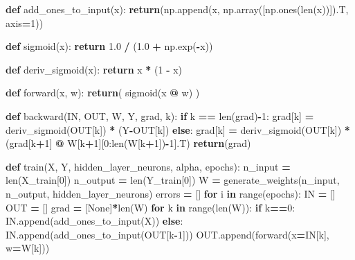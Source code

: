 \documentclass[
]{book}
\newenvironment{Shaded}{\begin{snugshade}}{\end{snugshade}}
\newcommand{\BuiltInTok}[1]{#1}
\newcommand{\ControlFlowTok}[1]{\textcolor[rgb]{0.13,0.29,0.53}{\textbf{#1}}}
\newcommand{\DecValTok}[1]{\textcolor[rgb]{0.00,0.00,0.81}{#1}}
\newcommand{\FloatTok}[1]{\textcolor[rgb]{0.00,0.00,0.81}{#1}}
\newcommand{\KeywordTok}[1]{\textcolor[rgb]{0.13,0.29,0.53}{\textbf{#1}}}
\newcommand{\NormalTok}[1]{#1}
\newcommand{\OperatorTok}[1]{\textcolor[rgb]{0.81,0.36,0.00}{\textbf{#1}}}
\newcommand{\VariableTok}[1]{\textcolor[rgb]{0.00,0.00,0.00}{#1}}
\begin{document}
\begin{Shaded}
\begin{Highlighting}[]
\KeywordTok{def}\NormalTok{ add\_ones\_to\_input(x):}
  \ControlFlowTok{return}\NormalTok{(np.append(x, np.array([np.ones(}\BuiltInTok{len}\NormalTok{(x))]).T, axis}\OperatorTok{=}\DecValTok{1}\NormalTok{))}



\KeywordTok{def}\NormalTok{ sigmoid(x):}
  \ControlFlowTok{return} \FloatTok{1.0} \OperatorTok{/}\NormalTok{ (}\FloatTok{1.0} \OperatorTok{+}\NormalTok{ np.exp(}\OperatorTok{{-}}\NormalTok{x))}

\KeywordTok{def}\NormalTok{ deriv\_sigmoid(x):}
  \ControlFlowTok{return}\NormalTok{ x }\OperatorTok{*}\NormalTok{ (}\DecValTok{1} \OperatorTok{{-}}\NormalTok{ x)}


\KeywordTok{def}\NormalTok{ forward(x, w):}
  \ControlFlowTok{return}\NormalTok{( sigmoid(x }\OperatorTok{@}\NormalTok{ w) )}

\KeywordTok{def}\NormalTok{ backward(IN, OUT, W, Y, grad, k):}
  \ControlFlowTok{if}\NormalTok{ k }\OperatorTok{==} \BuiltInTok{len}\NormalTok{(grad)}\OperatorTok{{-}}\DecValTok{1}\NormalTok{:}
\NormalTok{    grad[k] }\OperatorTok{=}\NormalTok{ deriv\_sigmoid(OUT[k]) }\OperatorTok{*}\NormalTok{ (Y}\OperatorTok{{-}}\NormalTok{OUT[k])}
  \ControlFlowTok{else}\NormalTok{:}
\NormalTok{    grad[k] }\OperatorTok{=}\NormalTok{ deriv\_sigmoid(OUT[k]) }\OperatorTok{*}\NormalTok{(grad[k}\OperatorTok{+}\DecValTok{1}\NormalTok{] }\OperatorTok{@}\NormalTok{ W[k}\OperatorTok{+}\DecValTok{1}\NormalTok{][}\DecValTok{0}\NormalTok{:}\BuiltInTok{len}\NormalTok{(W[k}\OperatorTok{+}\DecValTok{1}\NormalTok{])}\OperatorTok{{-}}\DecValTok{1}\NormalTok{].T)}
  \ControlFlowTok{return}\NormalTok{(grad)}

\KeywordTok{def}\NormalTok{ train(X, Y, hidden\_layer\_neurons, alpha, epochs):}
\NormalTok{  n\_input }\OperatorTok{=} \BuiltInTok{len}\NormalTok{(X\_train[}\DecValTok{0}\NormalTok{])}
\NormalTok{  n\_output }\OperatorTok{=} \BuiltInTok{len}\NormalTok{(Y\_train[}\DecValTok{0}\NormalTok{])}
\NormalTok{  W }\OperatorTok{=}\NormalTok{ generate\_weights(n\_input, n\_output, hidden\_layer\_neurons)}
\NormalTok{  errors }\OperatorTok{=}\NormalTok{ []}
  \ControlFlowTok{for}\NormalTok{ i }\KeywordTok{in} \BuiltInTok{range}\NormalTok{(epochs):}
\NormalTok{    IN }\OperatorTok{=}\NormalTok{ []}
\NormalTok{    OUT }\OperatorTok{=}\NormalTok{ []}
\NormalTok{    grad }\OperatorTok{=}\NormalTok{ [}\VariableTok{None}\NormalTok{]}\OperatorTok{*}\BuiltInTok{len}\NormalTok{(W)}
    \ControlFlowTok{for}\NormalTok{ k }\KeywordTok{in} \BuiltInTok{range}\NormalTok{(}\BuiltInTok{len}\NormalTok{(W)):}
      \ControlFlowTok{if}\NormalTok{ k}\OperatorTok{==}\DecValTok{0}\NormalTok{:}
\NormalTok{        IN.append(add\_ones\_to\_input(X))}
      \ControlFlowTok{else}\NormalTok{:}
\NormalTok{        IN.append(add\_ones\_to\_input(OUT[k}\OperatorTok{{-}}\DecValTok{1}\NormalTok{]))}
\NormalTok{      OUT.append(forward(x}\OperatorTok{=}\NormalTok{IN[k], w}\OperatorTok{=}\NormalTok{W[k]))}
      

\end{Highlighting}
\end{Shaded}
\end{document}
